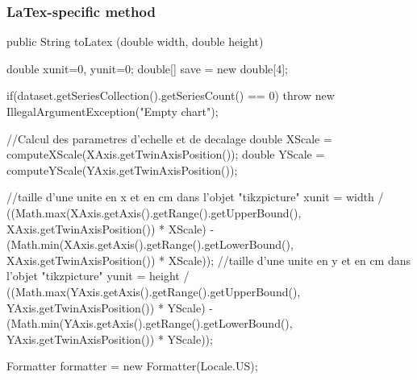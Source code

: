 \subsubsection*{LaTex-specific method}

\begin{code}

   public String toLatex (double width, double height) \begin{hide} {
      double xunit=0, yunit=0;
      double[] save = new double[4];

      if(dataset.getSeriesCollection().getSeriesCount() == 0)
         throw new IllegalArgumentException("Empty chart");

      //Calcul des parametres d'echelle et de decalage
      double XScale = computeXScale(XAxis.getTwinAxisPosition());
      double YScale = computeYScale(YAxis.getTwinAxisPosition());

         //taille d'une unite en x et en cm dans l'objet "tikzpicture"
      xunit = width / ((Math.max(XAxis.getAxis().getRange().getUpperBound(),
                            XAxis.getTwinAxisPosition()) * XScale)
             - (Math.min(XAxis.getAxis().getRange().getLowerBound(),
                    XAxis.getTwinAxisPosition()) * XScale));
         //taille d'une unite en y et en cm dans l'objet "tikzpicture"
      yunit = height / ((Math.max(YAxis.getAxis().getRange().getUpperBound(),
                         YAxis.getTwinAxisPosition()) * YScale)
           - (Math.min(YAxis.getAxis().getRange().getLowerBound(),
                  YAxis.getTwinAxisPosition()) * YScale));

      Formatter formatter = new Formatter(Locale.US);

}
\end{hide}
\end{code}
